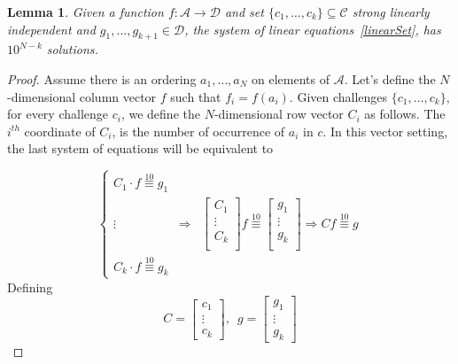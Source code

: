 \documentclass{article}
\newtheorem{lemma}[theorem]{Lemma}
\begin{document}
\begin{lemma}
\label{lem:linearIndep}
	Given a function $f:\mathcal{A}\to \mathcal{D}$ and set $\{c_1,\ldots,c_k\} \subseteq \mathcal{C}$ strong linearly independent and $g_1,\ldots,g_{k+1}\in\mathcal{D}$, the system of linear equations~\ref{linearSet}, has $10^{N-{k}}$ solutions. 
\end{lemma}	
\begin{proof}
Assume there is an ordering $a_1,\ldots,a_N$ on elements of $\mathcal{A}$. Let's define the $N$-dimensional column vector ${f}$ such that ${f}_i=f(a_i)$. Given challenges $\{c_1,\ldots,c_k\}$, for every challenge $c_i$, we define the $N$-dimensional row vector ${C_i}$ as follows. The $i^{th}$ coordinate of ${C_i}$, is the number of occurrence of $a_i$ in $c$. In this vector setting, the last system of equations will be equivalent to 

	\begin{equation}
	\label{eq:matrix}
	\left\{ \begin{array}{lcr}
     {C_1}\cdot {f} \overset{10}{\equiv} g_1 &  \\
     \vdots  & \Rightarrow &  
     
     \left[ \begin{array}{l}
     {C}_1 \\
     \vdots \\
     {C}_{k} \\
     \end{array}
     \right]     {f}\overset{10}{\equiv}
     
     \left[ \begin{array}{l}
     {g}_1 \\
     \vdots \\
     {g}_{k} \\
     \end{array}
     \right] \Rightarrow C{f} \overset{10}{\equiv} {g}   
      \\
     
     {C}_{k}\cdot {f} \overset{10}{\equiv} g_{k} & &
    \end{array} \right.
    \end{equation}
   	Defining 
   	$$
     C= \left[ \begin{array}{l}
     {c}_1 \\
     \vdots \\
     {c}_{k}
	 \end{array}\right] 
	 ,\,\,\, {g} = 
	 \left[
	 \begin{array}{l}
	 	g_1\\
	    \vdots \\
	 	g_k
	 \end{array}
	 \right] 
   	$$
   

\end{proof}
\end{document}
